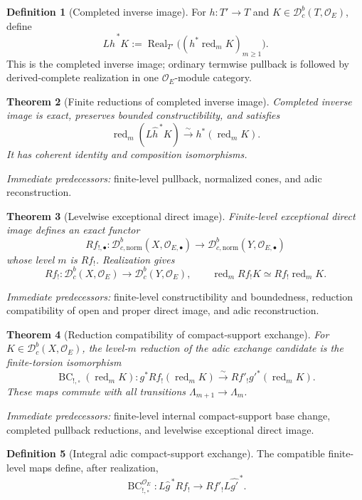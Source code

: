 \documentclass[10pt]{article}
\newtheorem{theorem}{Theorem}[section]
\theoremstyle{definition}
\newtheorem{definition}[theorem]{Definition}
\newcommand{\Dbc}{\mathcal D^b_c}
\newcommand{\Dbcnorm}{\mathcal D^b_{c,\mathrm{norm}}}
\newcommand{\pred}[1]{\par\smallskip\begingroup\footnotesize\raggedright
\emph{Immediate predecessors:} #1.\par\endgroup}
\begin{document}
\begin{definition}[Completed inverse image]
For \(h:T'\to T\) and \(K\in\Dbc(T,\mathcal O_E)\), define
\[
 L\widehat h^{\,*}K:=
 \operatorname{Real}_{T'}
 \bigl((h^*\operatorname{red}_mK)_{m\ge1}\bigr).
\]
This is the completed inverse image; ordinary termwise pullback is followed
by derived-complete realization in one \(\mathcal O_E\)-module category.
\end{definition}

\begin{theorem}[Finite reductions of completed inverse image]
Completed inverse image is exact, preserves bounded constructibility, and
satisfies
\[
 \operatorname{red}_m(L\widehat h^{\,*}K)
 \xrightarrow{\sim}h^*(\operatorname{red}_mK).
\]
It has coherent identity and composition isomorphisms.
\end{theorem}
\pred{finite-level pullback, normalized cones, and adic reconstruction}

\begin{theorem}[Levelwise exceptional direct image]
Finite-level exceptional direct image defines an exact functor
\[
 Rf_{!,\bullet}:
 \Dbcnorm(X,\mathcal O_{E,\bullet})
 \longrightarrow\Dbcnorm(Y,\mathcal O_{E,\bullet})
\]
whose level \(m\) is \(Rf_!\).  Realization gives
\[
 Rf_!:\Dbc(X,\mathcal O_E)\longrightarrow\Dbc(Y,\mathcal O_E),
\qquad
 \operatorname{red}_mRf_!K\simeq Rf_!\operatorname{red}_mK.
\]
\end{theorem}
\pred{finite-level constructibility and boundedness, reduction compatibility of open and proper direct image, and adic reconstruction}

\begin{theorem}[Reduction compatibility of compact-support exchange]
For \(K\in\Dbc(X,\mathcal O_E)\), the level-\(m\) reduction of the adic
exchange candidate is the finite-torsion isomorphism
\[
 \operatorname{BC}_{!,\square}(\operatorname{red}_mK):
 g^*Rf_!(\operatorname{red}_mK)
 \xrightarrow{\sim}
 Rf'_!g'^*(\operatorname{red}_mK).
\]
These maps commute with all transitions \(\Lambda_{m+1}\to\Lambda_m\).
\end{theorem}
\pred{finite-level internal compact-support base change, completed pullback reductions, and levelwise exceptional direct image}

\begin{definition}[Integral adic compact-support exchange]
The compatible finite-level maps define, after realization,
\[
 \operatorname{BC}^{\mathcal O_E}_{!,\square}:
 L\widehat g^{\,*}Rf_!
 \longrightarrow
 Rf'_!L\widehat {g'}^{\,*}.
\]
\end{definition}
\end{document}
